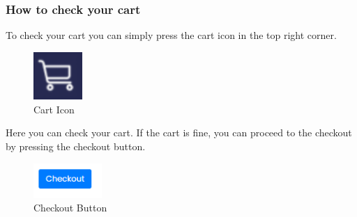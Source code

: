 \subsubsection{How to check your cart} \label{_checkcart}
To check your cart you can simply press the cart icon in the top right corner.
\begin{figure}[H]
    \centering
    \includegraphics[width=5em]{res/images/cliente/carticon.png}
    \caption{Cart Icon}
\end{figure}
Here you can check your cart. If the cart is fine, you can proceed to the checkout by pressing the checkout button.
\begin{figure}[H]
    \centering
    \includegraphics[width=7em]{res/images/cliente/checkoutbutton.png}
    \caption{Checkout Button}
\end{figure}

